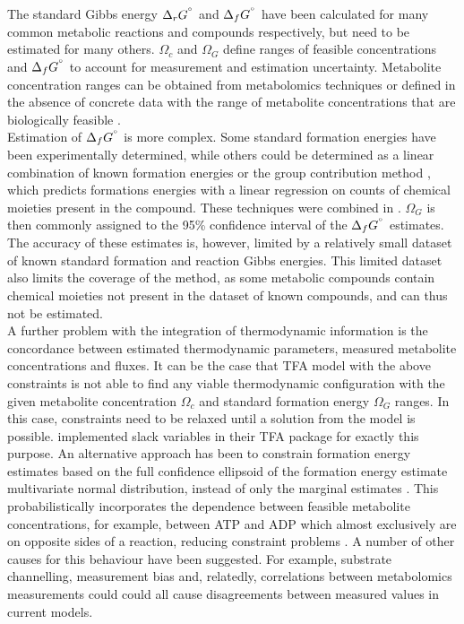 \documentclass[11pt]{article}
\newcommand{\sdgf}{\Delta_fG^{\degree}}
\newcommand{\sdgr}{\Delta_rG^{\degree}}
\begin{document}
	The standard Gibbs energy $\sdgr$ and $\sdgf$ have been calculated for many common metabolic reactions and compounds
	respectively, but need to be estimated for many others.
	$\Omega_c$ and $\Omega_G$ define ranges of feasible concentrations and $\sdgf$ to account for measurement and estimation uncertainty.
	Metabolite concentration ranges can be obtained from metabolomics techniques or defined in the absence of concrete data with the
	range of metabolite concentrations that are biologically feasible \cite{HENRY_2007_tmfa}. \\

	Estimation of $\sdgf$ is more complex.
	Some standard formation energies have been experimentally determined, while others
	could be determined as a linear combination of known formation energies \cite{ALBERTY_1998_thermo_data} or the
	group contribution method
	\cite{Mavrovouniotis_1990_group_contribtuion, JANKOWSKI_2008_group_contribution}, which predicts formations energies
	with a linear regression on counts of chemical moieties present in the compound.
	These techniques were combined in \cite{noor_2013_equilibrator}.
	$\Omega_G$ is then commonly assigned to the 95\% confidence interval of the $\sdgf$ estimates.
	The accuracy of these estimates is, however, limited by a relatively small dataset of known standard
	formation and reaction Gibbs energies.
	This limited dataset also limits the coverage of the method, as some metabolic compounds contain chemical moieties
	not present in the dataset of known compounds, and can thus not be estimated. \\

	A further problem with the integration of thermodynamic information is the concordance between estimated thermodynamic
	parameters, measured metabolite concentrations \cite{vishnu_problems_with_constraints} and fluxes.
	It can be the case that TFA model with the above constraints is not able to find any viable thermodynamic configuration
	with the given metabolite concentration $\Omega_c$ and standard formation energy $\Omega_G$ ranges.
	In this case, constraints need to be relaxed until a solution from the model is possible.
	\textcite{Salvy_2018_pytfa} implemented slack variables in their TFA package for exactly this purpose.
	An alternative approach has been to constrain formation energy estimates based on the full confidence ellipsoid of
	the formation energy estimate multivariate normal distribution, instead of only the marginal estimates
	\cite{gollub_2021_prob_sampling, vishnu_2021_multiTFA}.
	This probabilistically incorporates the dependence between feasible metabolite concentrations, for example, between ATP and ADP
	which almost exclusively are on opposite sides of a reaction, reducing constraint problems \cite{vishnu_2021_multiTFA}.
	A number of other causes for this behaviour have been suggested.
	For example, substrate channelling, measurement bias and, relatedly,
	correlations between metabolomics measurements could could all cause disagreements between measured values in current models\cite{gollub_2021_prob_sampling, vishnu_problems_with_constraints}.
\end{document}
